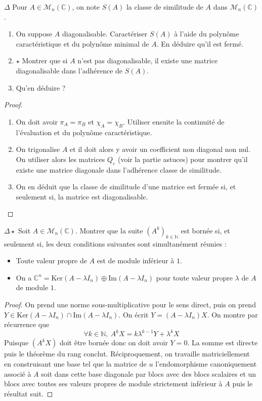 \documentclass[french,a4paper]{article}
\newcommand{\N}{\mathbb{N}}
\newcommand{\C}{\mathbb{C}}
\renewcommand{\ker}{\text{Ker}}
\newcommand{\im}{\text{Im}}
\theoremstyle{plain}
\theoremstyle{definition}
\theoremstyle{remark}
\begin{document}
\begin{ex}{$\Delta$}
	Pour $A\in\mathcal{M}_n(\C)$, on note $S(A)$ la classe de similitude de $A$ dans $\mathcal{M}_n(\C)$.
	\begin{enumerate}
		\item On suppose $A$ diagonalisable. Caractériser $S(A)$ à l'aide du polynôme caractéristique et du polynôme minimal de $A$. En déduire qu'il est fermé.
		\item $\star$ Montrer que si $A$ n'est pas diagonalisable, il existe une matrice diagonalisable dans l'adhérence de $S(A)$.
		\item Qu'en déduire ?
	\end{enumerate}
\end{ex}
\begin{proof}
	\begin{enumerate}
		\item On doit avoir $\pi_A=\pi_B$ et $\chi_A=\chi_B$. Utiliser ensuite la continuité de l'évaluation et du polynôme caractéristique.
		\item On trigonalise $A$ et il doit alors y avoir un coefficient non diagonal non nul. On utiliser alors les matrices $Q_\varepsilon$ (voir la partie astuces) pour montrer qu'il existe une matrice diagonale dans l'adhérence classe de similitude.
		\item On en déduit que la classe de similitude d'une matrice est fermée si, et seulement si, la matrice est diagonalisable.
	\end{enumerate}
\end{proof}

\begin{ex}{$\Delta\star$}
	Soit $A\in\mathcal{M}_n(\C)$. Montrer que la suite $(A^k)_{k\in\N}$ est bornée si, et seulement si, les deux conditions suivantes sont simultanément réunies : 
	\begin{itemize}
		\item Toute valeur propre de $A$ est de module inférieur à $1$.
		\item On a $\C^n=\ker(A-\lambda I_n)\oplus\im(A-\lambda I_n)$ pour toute valeur propre $\lambda$ de $A$ de module $1$.
	\end{itemize}
\end{ex}
\begin{proof}
	On prend une norme sous-multiplicative pour le sens direct, puis on prend $Y\in\ker(A-\lambda I_n)\cap\im(A-\lambda I_n)$. On écrit $Y=(A-\lambda I_n)X$. On montre par récurrence que $$\forall k\in\N,\ A^kX=k\lambda^{k-1}Y+\lambda^k X$$ Puisque $(A^kX)$ doit être bornée donc on doit avoir $Y=0$. La somme est directe puis le théorème du rang conclut. Réciproquement, on travaille matriciellement en construisant une base tel que la matrice de $u$ l'endomorphisme canoniquement associé à $A$ soit dans cette base diagonale par blocs avec des blocs scalaires et un blocs avec toutes ses valeurs propres de module strictement inférieur à $A$ puis le résultat suit.
\end{proof}
\end{document}

